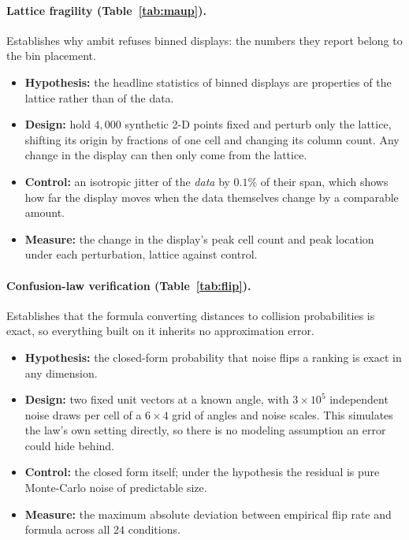 \documentclass[11pt,letterpaper]{article}
\begin{document}
\paragraph{Lattice fragility (Table~\ref{tab:maup}).}
Establishes why \textsf{ambit} refuses binned displays: the numbers
they report belong to the bin placement.
\begin{itemize}
  \item \textbf{Hypothesis:} the headline
statistics of binned displays are properties of the lattice rather than of
the data.
  \item \textbf{Design:} hold $4{,}000$ synthetic 2-D points fixed and perturb only the
lattice, shifting its origin by fractions of one cell and changing its
column count. Any change in the display can then only come from the
lattice.
  \item \textbf{Control:} an isotropic jitter of the \emph{data} by $0.1\%$ of
their span, which shows how far the display moves when the data
themselves change by a comparable amount.
  \item \textbf{Measure:} the change in the display's peak
cell count and peak location under each perturbation, lattice against
control.
\end{itemize}


\paragraph{Confusion-law verification (Table~\ref{tab:flip}).}
Establishes that the formula converting distances to collision
probabilities is exact, so everything built on it inherits no
approximation error.
\begin{itemize}
  \item \textbf{Hypothesis:} the
closed-form probability that noise flips a ranking is exact in any
dimension.
  \item \textbf{Design:} two fixed unit vectors at a known angle, with $3 \times 10^5$
independent noise draws per cell of a $6 \times 4$ grid of angles and
noise scales. This simulates the law's own setting directly, so there
is no modeling assumption an error could hide behind.
  \item \textbf{Control:} the closed form itself; under
the hypothesis the residual is pure Monte-Carlo noise of predictable
size.
  \item \textbf{Measure:} the maximum absolute deviation between empirical flip rate
and formula across all $24$ conditions.
\end{itemize}

\end{document}
